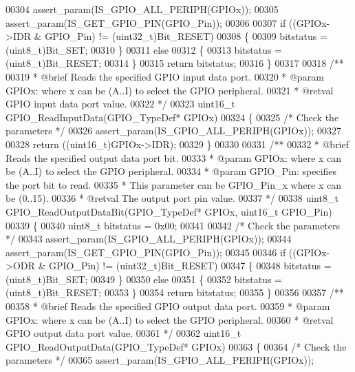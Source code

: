 \begin{DoxyCode}
00304   assert_param(IS\_GPIO\_ALL\_PERIPH(GPIOx));
00305   assert_param(IS\_GET\_GPIO\_PIN(GPIO\_Pin));
00306 
00307   \textcolor{keywordflow}{if} ((GPIOx->IDR & GPIO\_Pin) != (uint32\_t)Bit\_RESET)
00308   \{
00309     bitstatus = (uint8\_t)Bit\_SET;
00310   \}
00311   \textcolor{keywordflow}{else}
00312   \{
00313     bitstatus = (uint8\_t)Bit\_RESET;
00314   \}
00315   \textcolor{keywordflow}{return} bitstatus;
00316 \}
00317 
00318 \textcolor{comment}{/**}
00319 \textcolor{comment}{  * @brief  Reads the specified GPIO input data port.}
00320 \textcolor{comment}{  * @param  GPIOx: where x can be (A..I) to select the GPIO peripheral.}
00321 \textcolor{comment}{  * @retval GPIO input data port value.}
00322 \textcolor{comment}{  */}
00323 uint16\_t GPIO_ReadInputData(GPIO\_TypeDef* GPIOx)
00324 \{
00325   \textcolor{comment}{/* Check the parameters */}
00326   assert_param(IS\_GPIO\_ALL\_PERIPH(GPIOx));
00327 
00328   \textcolor{keywordflow}{return} ((uint16\_t)GPIOx->IDR);
00329 \}
00330 
00331 \textcolor{comment}{/**}
00332 \textcolor{comment}{  * @brief  Reads the specified output data port bit.}
00333 \textcolor{comment}{  * @param  GPIOx: where x can be (A..I) to select the GPIO peripheral.}
00334 \textcolor{comment}{  * @param  GPIO\_Pin: specifies the port bit to read.}
00335 \textcolor{comment}{  *          This parameter can be GPIO\_Pin\_x where x can be (0..15).}
00336 \textcolor{comment}{  * @retval The output port pin value.}
00337 \textcolor{comment}{  */}
00338 uint8\_t GPIO_ReadOutputDataBit(GPIO\_TypeDef* GPIOx, uint16\_t GPIO\_Pin)
00339 \{
00340   uint8\_t bitstatus = 0x00;
00341 
00342   \textcolor{comment}{/* Check the parameters */}
00343   assert_param(IS\_GPIO\_ALL\_PERIPH(GPIOx));
00344   assert_param(IS\_GET\_GPIO\_PIN(GPIO\_Pin));
00345 
00346   \textcolor{keywordflow}{if} ((GPIOx->ODR & GPIO\_Pin) != (uint32\_t)Bit\_RESET)
00347   \{
00348     bitstatus = (uint8\_t)Bit\_SET;
00349   \}
00350   \textcolor{keywordflow}{else}
00351   \{
00352     bitstatus = (uint8\_t)Bit\_RESET;
00353   \}
00354   \textcolor{keywordflow}{return} bitstatus;
00355 \}
00356 
00357 \textcolor{comment}{/**}
00358 \textcolor{comment}{  * @brief  Reads the specified GPIO output data port.}
00359 \textcolor{comment}{  * @param  GPIOx: where x can be (A..I) to select the GPIO peripheral.}
00360 \textcolor{comment}{  * @retval GPIO output data port value.}
00361 \textcolor{comment}{  */}
00362 uint16\_t GPIO_ReadOutputData(GPIO\_TypeDef* GPIOx)
00363 \{
00364   \textcolor{comment}{/* Check the parameters */}
00365   assert_param(IS\_GPIO\_ALL\_PERIPH(GPIOx));

\end{DoxyCode}
